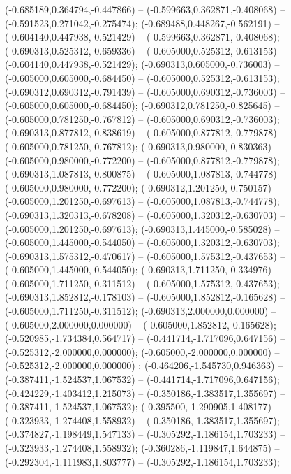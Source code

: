  (-0.685189,0.364794,-0.447866) -- (-0.599663,0.362871,-0.408068) -- (-0.591523,0.271042,-0.275474);
 (-0.689488,0.448267,-0.562191) -- (-0.604140,0.447938,-0.521429) -- (-0.599663,0.362871,-0.408068);
 (-0.690313,0.525312,-0.659336) -- (-0.605000,0.525312,-0.613153) -- (-0.604140,0.447938,-0.521429);
 (-0.690313,0.605000,-0.736003) -- (-0.605000,0.605000,-0.684450) -- (-0.605000,0.525312,-0.613153);
 (-0.690312,0.690312,-0.791439) -- (-0.605000,0.690312,-0.736003) -- (-0.605000,0.605000,-0.684450);
 (-0.690312,0.781250,-0.825645) -- (-0.605000,0.781250,-0.767812) -- (-0.605000,0.690312,-0.736003);
 (-0.690313,0.877812,-0.838619) -- (-0.605000,0.877812,-0.779878) -- (-0.605000,0.781250,-0.767812);
 (-0.690313,0.980000,-0.830363) -- (-0.605000,0.980000,-0.772200) -- (-0.605000,0.877812,-0.779878);
 (-0.690313,1.087813,-0.800875) -- (-0.605000,1.087813,-0.744778) -- (-0.605000,0.980000,-0.772200);
 (-0.690312,1.201250,-0.750157) -- (-0.605000,1.201250,-0.697613) -- (-0.605000,1.087813,-0.744778);
 (-0.690313,1.320313,-0.678208) -- (-0.605000,1.320312,-0.630703) -- (-0.605000,1.201250,-0.697613);
 (-0.690313,1.445000,-0.585028) -- (-0.605000,1.445000,-0.544050) -- (-0.605000,1.320312,-0.630703);
 (-0.690313,1.575312,-0.470617) -- (-0.605000,1.575312,-0.437653) -- (-0.605000,1.445000,-0.544050);
 (-0.690313,1.711250,-0.334976) -- (-0.605000,1.711250,-0.311512) -- (-0.605000,1.575312,-0.437653);
 (-0.690313,1.852812,-0.178103) -- (-0.605000,1.852812,-0.165628) -- (-0.605000,1.711250,-0.311512);
 (-0.690313,2.000000,0.000000) -- (-0.605000,2.000000,0.000000) -- (-0.605000,1.852812,-0.165628);
 (-0.520985,-1.734384,0.564717) -- (-0.441714,-1.717096,0.647156) -- (-0.525312,-2.000000,0.000000);
 (-0.605000,-2.000000,0.000000) -- (-0.525312,-2.000000,0.000000) ;
 (-0.464206,-1.545730,0.946363) -- (-0.387411,-1.524537,1.067532) -- (-0.441714,-1.717096,0.647156);
 (-0.424229,-1.403412,1.215073) -- (-0.350186,-1.383517,1.355697) -- (-0.387411,-1.524537,1.067532);
 (-0.395500,-1.290905,1.408177) -- (-0.323933,-1.274408,1.558932) -- (-0.350186,-1.383517,1.355697);
 (-0.374827,-1.198449,1.547133) -- (-0.305292,-1.186154,1.703233) -- (-0.323933,-1.274408,1.558932);
 (-0.360286,-1.119847,1.644875) -- (-0.292304,-1.111983,1.803777) -- (-0.305292,-1.186154,1.703233);
